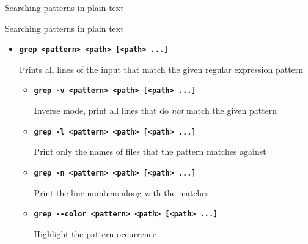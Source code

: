 \documentclass[aspectratio=1610]{beamer}
\newcommand\curtitle{}
\newcommand\command[1]{\alert{\textbf{\texttt{#1}}}}
\begin{document}
\renewcommand\curtitle{Searching patterns in plain text}

\begin{frame}[c]
    \Huge \curtitle
\end{frame}


\begin{frame}[c]{\curtitle}
    \begin{itemize}[<+->]\setlength\itemsep{1em}
        \item \command{grep <pattern> <path> [<path> ...]}

            Prints all lines of the input that match the given \alert{regular expression pattern}
            \pause
            \begin{itemize}[<.->]
                \item \command{grep -v <pattern> <path> [<path> ...]}

                    Inverse mode, print all lines that do \emph{not} match the given pattern
                \item \command{grep -l <pattern> <path> [<path> ...]}

                    Print only the names of files that the pattern matches against
                \item \command{grep -n <pattern> <path> [<path> ...]}

                    Print the line numbers along with the matches
                \item \command{grep -{-}color <pattern> <path> [<path> ...]}

                    Highlight the pattern occurrence
            \end{itemize}
    \end{itemize}
\end{frame}

\end{document}
